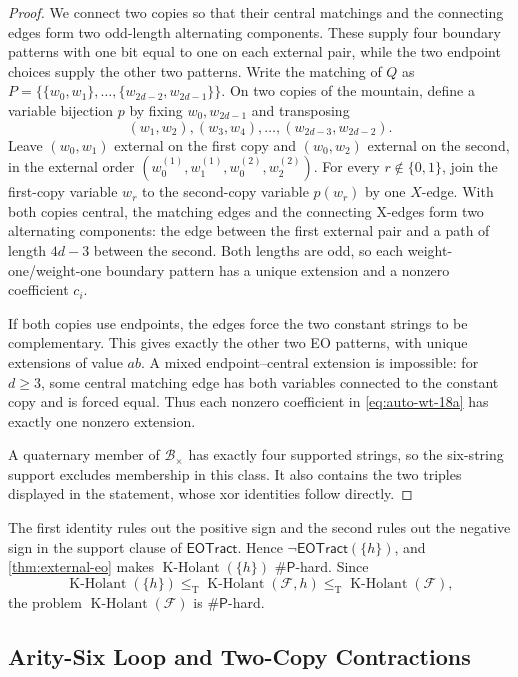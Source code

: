 \documentclass[11pt,letterpaper,onecolumn]{article}
\theoremstyle{plain}
\theoremstyle{definition}
\theoremstyle{remark}
\newcommand{\cF}{\mathcal F}
\newcommand{\KHolant}{\operatorname{K\text{-}Holant}}
\newcommand{\EOTract}{\mathsf{EOTract}}
\newcommand{\SharpP}{\#\mathsf P}
\newcommand{\leT}{\leq_{\mathrm T}}
\begin{document}
	\begin{proof}
		We connect two copies so that their central matchings and the connecting
		edges form two odd-length alternating components. These supply four
		boundary patterns with one bit equal to one on each external pair,
		while the two endpoint choices supply the other two patterns.
		Write the matching of \(Q\) as
		\(P=\{\{w_0,w_1\},\ldots,\{w_{2d-2},w_{2d-1}\}\}\).  On two copies of
		the mountain, define a variable bijection \(p\) by fixing
		\(w_0,w_{2d-1}\) and transposing
		\[
		(w_1,w_2),(w_3,w_4),\ldots,(w_{2d-3},w_{2d-2}).
		\]
		Leave \((w_0,w_1)\) external on the first copy and \((w_0,w_2)\)
		external on the second, in the external order
		\((w_0^{(1)},w_1^{(1)},w_0^{(2)},w_2^{(2)})\).  For every
		\(r\notin\{0,1\}\), join the
		first-copy variable \(w_r\) to the second-copy variable \(p(w_r)\) by one \(X\)-edge.  With both copies central, the matching edges and the connecting X-edges form
		two alternating components: the edge between the first external pair and
		a path of length $4d-3$ between the second.  Both lengths are odd, so each
		weight-one/weight-one boundary pattern has a unique extension and a
		nonzero coefficient $c_i$.
		
		If both copies use endpoints, the edges force the two constant strings
		to be complementary.  This gives exactly the other two EO patterns, with
		unique extensions of value \(ab\).  A mixed endpoint--central extension is
		impossible: for $d\ge3$, some central matching edge has both variables connected to
		the constant copy and is forced equal.  Thus each nonzero coefficient in \eqref{eq:auto-wt-18a} has exactly one nonzero extension.
		
		A quaternary member of \(\mathcal B_\times\) has exactly four supported
		strings, so the six-string support excludes membership in this class.
		It also contains the two triples displayed in the statement, whose xor
		identities follow directly.
	\end{proof}

The first identity rules out the positive sign and the second rules out
		the negative sign in the support clause of \(\EOTract\).  Hence
		\(\neg\EOTract(\{h\})\), and \cref{thm:external-eo} makes
		\(\KHolant(\{h\})\) \(\SharpP\)-hard.  Since
		\[
		\KHolant(\{h\})
		\leT\KHolant(\cF,h)
		\leT\KHolant(\cF),
		\]
		the problem \(\KHolant(\cF)\) is \(\SharpP\)-hard.
	
	\subsection{Arity-Six Loop and Two-Copy Contractions}
	\label{subsec:hc-q6-base}
	
\end{document}
